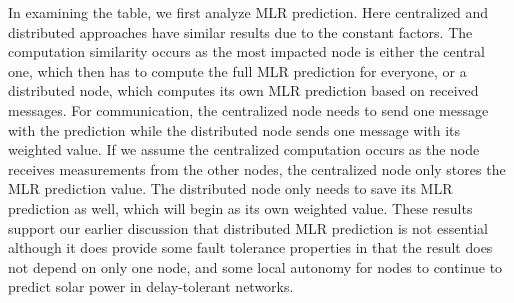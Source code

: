 \documentclass[prodmode,acmtosn]{acmsmall}
\begin{document}
\begin{table*}[b]
\centering
{}
\end{table*}

In examining the table, we first analyze MLR prediction.
Here centralized and distributed approaches have similar results due to the constant factors.
The computation similarity occurs as the most impacted node is either the central one, which then has to compute the full MLR prediction for everyone, or a distributed node, which computes its own MLR prediction based on received messages.
For communication, the centralized node needs to send one message with the prediction while the distributed node sends one message with its weighted value.
If we assume the centralized computation occurs as the node receives measurements from the other nodes, the centralized node only stores the MLR prediction value.
The distributed node only needs to save its MLR prediction as well, which will begin as its own weighted value.
These results support our earlier discussion that distributed MLR prediction is not essential although it does provide some fault tolerance properties in that the result does not depend on only one node, and some local autonomy for nodes to continue to predict solar power in delay-tolerant networks.
\end{document}
